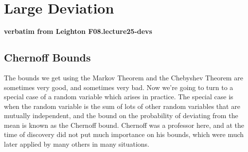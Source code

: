 \chapter{Large Deviation}

\begin{center}
\textbf{\large verbatim from Leighton F08.lecture25-devs}
\end{center}

\section{Chernoff Bounds}
The bounds we get using the Markov Theorem and the Chebyshev Theorem are
sometimes very good, and sometimes very bad. Now we're going to turn to a
special case of a random variable which arises in practice. The special
case is when the random variable is the sum of lots of other random
variables that are mutually independent, and the bound on the probability
of deviating from the mean is known as the Chernoff bound. Chernoff was a
professor here, and at the time of discovery did not put much importance
on his bounds, which were much later applied by many others in many
situations.

\iffalse
MIT is admitting a new crop of students.  The Institvte has offered
admission to a few thousand applicants and carefully estimated the
probability that each will accept, based on his or her interests,
enthusiasm, and other likely offers.  This calculation indicates that
the expected number of new students is 1000, which is the ideal
number.  However, MIT must be wary of weird happenings.  If the new
class is too small, then expenses must be divided among fewer
students, forcing tuition up.  If the new class is too large, then
living conditions and classes will be crowded.  What is the
probability that MIT must cope with significantly fewer or more
students?

Similar problems arise again and again in the analysis of computer
systems and algorithms.  The general theme is that there are many
events that \textit{can} occur, and we need to prove that the number
that actually \textit{do} occur is unlikely to be much greater or much
less than the expected number.  In terms of the probability density
function, we're trying to show that the tails are small:
%
\begin{center}
\texttt{[image: pdf-x2]}
\end{center}
%
If the events are mutually independent, then we can get quick results
to this effect from a powerful set of tools called \term{Chernoff
bounds}.
\fi

